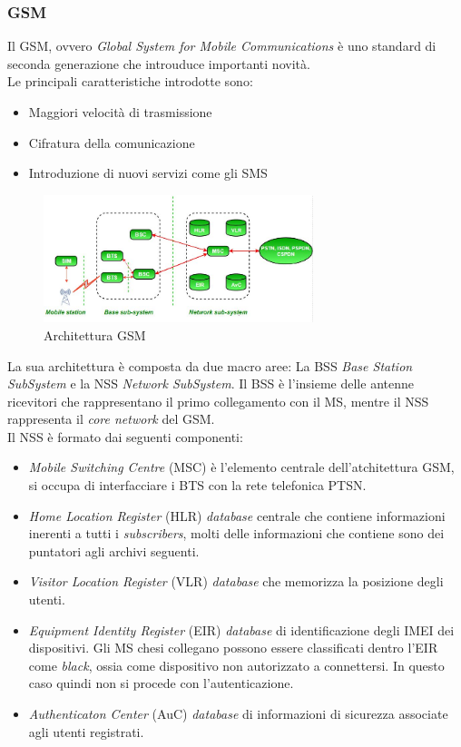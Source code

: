 \subsubsection{GSM}
Il GSM, ovvero \textit{Global System for Mobile Communications}\cite{gsm} è uno standard di seconda generazione che introuduce importanti novità.\\
Le principali caratteristiche introdotte sono:
\begin{itemize}
    \item Maggiori velocità di trasmissione
    \item Cifratura della comunicazione
    \item Introduzione di nuovi servizi come gli SMS
\end{itemize}
\begin{figure}[ht]
    \centering
    \includegraphics[width=0.7\textwidth]{images/2g-gsm.jpg}
    \caption{Architettura GSM}
\end{figure}
La sua architettura è composta da due macro aree: La BSS \textit{Base Station SubSystem} e la NSS \textit{Network SubSystem}.
Il BSS è l'insieme delle antenne ricevitori che rappresentano il primo collegamento con il MS, mentre il NSS rappresenta il \textit{core network} del GSM.\\
Il NSS è formato dai seguenti componenti:
\begin{itemize}
    \item \textit{Mobile Switching Centre} (MSC) è l'elemento centrale dell'atchitettura GSM, si occupa di interfacciare i BTS con la rete telefonica PTSN.
    \item \textit{Home Location Register} (HLR) \textit{database} centrale che contiene informazioni inerenti a tutti i \textit{subscribers}, molti delle informazioni
    che contiene sono dei puntatori agli archivi seguenti.
    \item \textit{Visitor Location Register} (VLR) \textit{database} che memorizza la posizione degli utenti.
    \item \textit{Equipment Identity Register} (EIR) \textit{database} di identificazione degli IMEI dei dispositivi. Gli MS chesi collegano possono 
    essere classificati dentro l'EIR come \textit{black}, ossia come dispositivo non autorizzato a connettersi. In questo caso quindi non si procede 
    con l'autenticazione.
    \item \textit{Authenticaton Center} (AuC) \textit{database} di informazioni di sicurezza associate agli utenti registrati.
\end{itemize}

